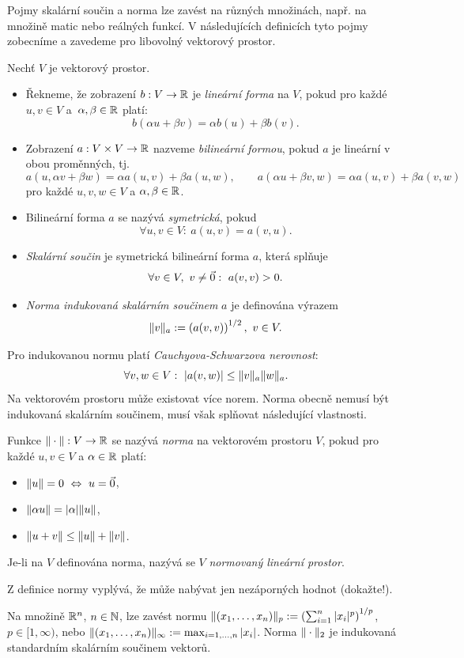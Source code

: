 Pojmy skalární součin a norma lze zavést na různých množinách, např. na množině matic nebo reálných funkcí.
V následujících definicích tyto pojmy zobecníme a zavedeme pro libovolný vektorový prostor.
\begin{df}
Nechť $V$ je vektorový prostor.
\begin{itemize}
\item[(i)] Řekneme, že zobrazení $b:V\rightarrow{\mathbb R}$ je \emph{lineární forma} na $V$, pokud pro každé $u,v\in V$ a~$\alpha,\beta\in{\mathbb R}$ platí:
\[ b(\alpha u+\beta v) = \alpha b(u) + \beta b(v). \]
\item[(ii)] Zobrazení $a:V\times V\rightarrow{\mathbb R}$ nazveme \emph{bilineární formou}, pokud $a$ je lineární v obou proměnných, tj.
\[ a(u,\alpha v+\beta w) = \alpha a(u,v) + \beta a(u,w), \qquad
 a(\alpha u+\beta v,w) = \alpha a(u,v) + \beta a(v,w) \]
pro každé $u,v,w\in V$ a $\alpha,\beta\in{\mathbb R}$.
\item[(iii)] Bilineární forma $a$ se nazývá \emph{symetrická}, pokud
\[ \forall u,v\in V:~a(u,v)=a(v,u). \]
\item[(iv)] \emph{Skalární součin} je symetrická bilineární forma $a$, která splňuje
\[ \forall v\in V,~v\neq \vec{0}:~a(v,v)>0. \]
\item[(v)] \emph{Norma indukovaná skalárním součinem} $a$ je definována výrazem
\[ \|v\|_a := \left(a(v,v)\right)^{1/2},~v\in V. \]
\end{itemize}
\end{df}
Pro indukovanou normu platí \emph{Cauchyova-Schwarzova nerovnost}:
\[ \forall v,w\in V: ~|a(v,w)| \le \|v\|_a\|w\|_a. \]
Na vektorovém prostoru může existovat více norem. Norma obecně nemusí být indukovaná skalárním součinem, musí však splňovat následující vlastnosti.
\begin{df}
Funkce $\|\cdot\|:V\rightarrow\mathbb R$ se nazývá \emph{norma} na vektorovém prostoru $V$, pokud pro každé $u,v\in V$ a $\alpha\in\mathbb R$ platí:
\begin{itemize}
\item[(i)] $\|u\|=0 ~\Leftrightarrow~u=\vec 0$,
\item[(ii)] $\|\alpha u\|=|\alpha|\|u\|$,
\item[(iii)] $\|u+v\|\le\|u\|+\|v\|$.
\end{itemize}
Je-li na $V$ definována norma, nazývá se $V$ \emph{normovaný lineární prostor}.
\end{df}
Z definice normy vyplývá, že může nabývat jen nezáporných hodnot (dokažte!).


\begin{ex}
Na množině $\mathbb R^n$, $n\in\mathbb N$, lze zavést normu $\|(x_1,\ldots,x_n)\|_p:=\left(\sum_{i=1}^n|x_i|^p\right)^{1/p}$, $p\in[1,\infty)$, nebo $\|(x_1,\ldots,x_n)\|_\infty:=\max_{i=1,\ldots,n}|x_i|$. Norma $\|\cdot\|_2$ je indukovaná standardním skalárním součinem vektorů.
\end{ex}

